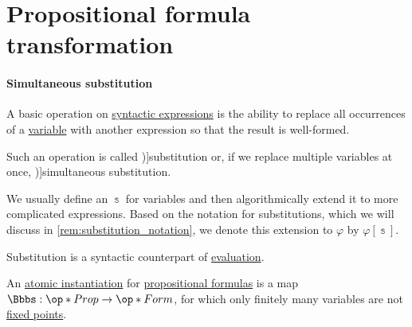 \section{Propositional formula transformation}\label{sec:propositional_formula_transformation}

\paragraph{Simultaneous substitution}

\begin{concept}\label{con:syntactic_substitution}
  A basic operation on \hyperref[con:expression]{syntactic expressions} is the ability to replace all occurrences of a \hyperref[con:variable]{variable} with another expression so that the result is well-formed.

  Such an operation is called \term[en=substitution (\cite[78]{Kleene1971Metamathematics})]{substitution} or, if we replace multiple variables at once, \term[en=simultaneous substitution (\cite[def. 3.1.3]{CitkinMuravitsky2022ConsequenceRelations})]{simultaneous substitution}.

  We usually define an  \( \Bbbs \) for variables and then algorithmically extend it to more complicated expressions. Based on the notation for substitutions, which we will discuss in \cref{rem:substitution_notation}, we denote this extension to \( \varphi \) by \( \varphi[\Bbbs] \).
\end{concept}
\begin{comments}
  \item Substitution is a syntactic counterpart of \hyperref[con:evaluation]{evaluation}.
\end{comments}

\begin{definition}\label{def:atomic_propositional_substitution}\mimprovised
  An \hyperref[con:syntactic_substitution]{atomic instantiation} for \hyperref[def:propositional_formula]{propositional formulas} is a map \( \Bbbs: \op*{Prop} \to \op*{Form} \), for which only finitely many variables are not \hyperref[def:function_fixed_point]{fixed points}.
\end{definition}

